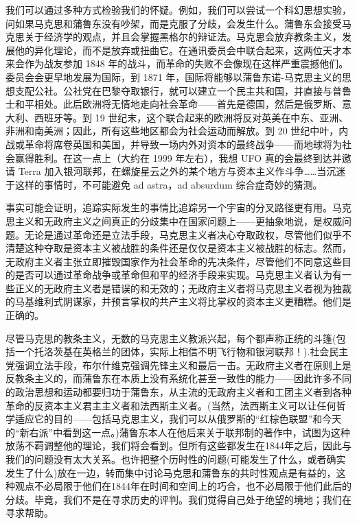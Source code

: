 \documentclass[DIV=12,%
               BCOR=0mm,%
               headinclude=false,%
               footinclude=false,open=any,%
               fontsize=10pt,%
               oneside,%
               paper=210mm:11in]%
               {scrbook}
\begin{document}
我们可以通过多种方式检验我们的怀疑。例如，我们可以尝试一个科幻思想实验，问如果马克思和蒲鲁东没有吵架，而是克服了分歧，会发生什么。蒲鲁东会接受马克思关于经济学的观点，并且会掌握黑格尔的辩证法。马克思会放弃教条主义，发展他的异化理论，而不是放弃或扭曲它。在通讯委员会中联合起来，这两位天才本来会作为战友参加 1848 年的战斗，而革命的失败不会像现在这样严重震撼他们。委员会会更早地发展为国际，到 1871 年，国际将能够以蒲鲁东诺-马克思主义的思想支配公社。公社党在巴黎夺取银行，就可以建立一个民主共和国，并直接与普鲁士和平相处。此后欧洲将无情地走向社会革命——首先是德国，然后是俄罗斯、意大利、西班牙等。到 19 世纪末，这个联合起来的欧洲将反对英美在中东、亚洲、非洲和南美洲；因此，所有这些地区都会为社会运动而解放。到 20 世纪中叶，内战或革命将席卷英国和美国，并导致一场内外对资本的最终战争——而地球将为社会赢得胜利。在这一点上（大约在 1999 年左右），我想 UFO 真的会最终到达并邀请 Terra 加入银河联邦，在螺旋星云之外的某个地方与资本主义作斗争\dots{}\dots{}当沉迷于这样的事情时，不可能避免 ad astra，ad absurdum 综合症奇妙的猜测。


事实可能会证明，追踪实际发生的事情比追踪另一个宇宙的分叉路径更有用。马克思主义和无政府主义之间真正的分歧集中在国家问题上——更抽象地说，是权威问题。无论是通过革命还是立法手段，马克思主义者决心夺取政权，尽管他们似乎不清楚这种夺取是资本主义被战胜的条件还是仅仅是资本主义被战胜的标志。然而，无政府主义者主张立即摧毁国家作为社会革命的先决条件，尽管他们不同意这些目的是否可以通过革命战争或革命但和平的经济手段来实现。马克思主义者认为有一些正义的无政府主义者是错误的和无效的；无政府主义者将马克思主义者视为独裁的马基维利式阴谋家，并预言掌权的共产主义将比掌权的资本主义更糟糕。他们是正确的。


尽管马克思的教条主义，无数的马克思主义教派兴起，每个都声称正统的斗篷(包括一个托洛茨基在英格兰的团体，实际上相信不明飞行物和银河联邦！).社会民主党强调立法手段，布尔什维克强调先锋主义和最后一击。无政府主义者在原则上是反教条主义的，而蒲鲁东在本质上没有系统化甚至一致性的能力——因此许多不同的政治思想和运动都要归功于蒲鲁东，从主流的无政府主义者和工团主义者到各种革命的反资本主义君主主义者和法西斯主义者。(当然，法西斯主义可以让任何哲学适应它的目的——包括马克思主义，我们可以从俄罗斯的“红棕色联盟”和今天的“新右派”中看到这一点。)蒲鲁东本人在他后来关于联邦制的著作中，试图为这种放荡不羁调整他的理论，我们将会看到。但所有这些都发生在1844年之后，因此与我们的问题没有太大关系。也许把整个历时性的问题(可能发生了什么，或者确实发生了什么)放在一边，转而集中讨论马克思和蒲鲁东的共时性观点是有益的，这种观点不必局限于他们在1844年在时间和空间上的巧合，也不必局限于他们此后的分歧。毕竟，我们不是在寻求历史的评判。我们觉得自己处于绝望的境地；我们在寻求帮助。
\end{document}
